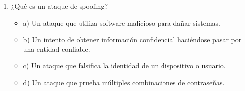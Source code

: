 \documentclass[a4paper]{article}
\begin{document}
\begin{enumerate}
    
    \item ¿Qué es un ataque de spoofing?
    \begin{itemize}
        \item a) Un ataque que utiliza software malicioso para dañar sistemas.
        \item b) Un intento de obtener información confidencial haciéndose pasar por una entidad confiable.
        \item c) Un ataque que falsifica la identidad de un dispositivo o usuario.
        \item d) Un ataque que prueba múltiples combinaciones de contraseñas.
    \end{itemize}
    

\end{enumerate}
\end{document}
